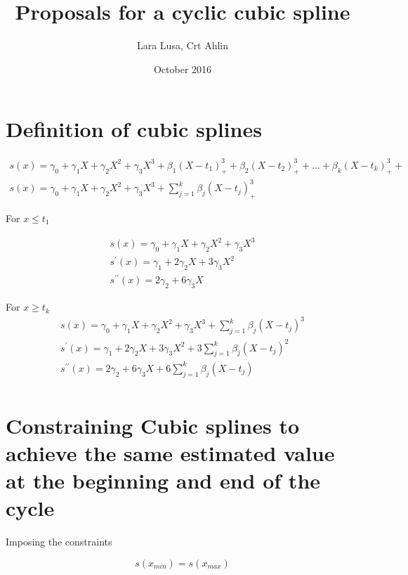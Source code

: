 \documentclass{article}
\author{Lara Lusa, Crt Ahlin}
\date{October 2016}
\title{Proposals for a cyclic cubic spline}
\begin{document}
\maketitle

\section{Definition of cubic splines}
\begin{gather}
s(x)=\gamma_0+\gamma_1 X + \gamma_2 X^2 + \gamma_3 X^3 + \beta_1 (X-t_1)^3_{+}+ \beta_2 (X-t_2)^3_{+}+ ... +\beta_k (X-t_k)^3_{+}+ \\
s(x)=\gamma_0+\gamma_1 X + \gamma_2 X^2 + \gamma_3 X^3 + \sum_{j=1}^k\beta_j (X-t_j)^3_{+}
\end{gather}



For \(x \le t_1\) 

\begin{gather*} 
s(x)=\gamma_0+\gamma_1 X + \gamma_2 X^2 + \gamma_3 X^3 \\
s^{\prime}(x)=\gamma_1 + 2\gamma_2 X + 3\gamma_3 X^2  \\
s^{\prime\prime}(x)= 2\gamma_2  + 6\gamma_3 X  
\end{gather*}

For $x \ge t_k$ 
\begin{gather*}
s(x)=\gamma_0+\gamma_1 X + \gamma_2 X^2 + \gamma_3 X^3 + \sum_{j=1}^k\beta_j (X-t_j)^3 \\
s^{\prime}(x)=\gamma_1 + 2\gamma_2 X + 3\gamma_3 X^2 + 3\sum_{j=1}^k\beta_j (X-t_j)^2 \\
s^{\prime\prime}(x)= 2\gamma_2  + 6\gamma_3 X + 6\sum_{j=1}^k\beta_j (X-t_j) \\
\end{gather*}


\section{Constraining Cubic splines to achieve the same estimated value at the beginning and end of the cycle}

Imposing the constraints

\[ s(x_{min})=s(x_{max}) \]
\end{document}
